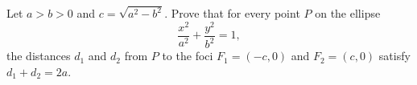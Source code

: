 Let $a>b>0$ and $c=\sqrt{a^2-b^2}$. Prove that for every point $P$ on the ellipse
\[\dfrac{x^2}{a^2}+\dfrac{y^2}{b^2}=1,\]
the distances $d_1$ and $d_2$ from $P$ to the foci $F_1=(-c,0)$ and $F_2=(c,0)$ satisfy $d_1+d_2=2a$.
